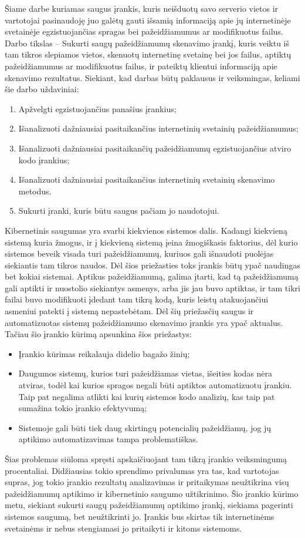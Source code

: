 Šiame darbe kuriamas saugus įrankis, kuris neišduotų savo serverio vietos ir vartotojai pasinaudoję juo galėtų gauti išsamią informaciją apie jų internetinėje svetainėje egzistuojančias spragas
bei pažeidžiamumus ar modifikuotus failus. Darbo tikslas – Sukurti saugų pažeidžiamumų skenavimo įrankį, kuris veiktu iš tam tikros slepiamos vietos, skenuotų internetinę
svetainę bei jos failus, aptiktų pažeidžiamumus ar modifikuotus failus, ir pateiktų klientui informaciją apie skenavimo rezultatus. Siekiant, kad darbas būtų paklausus ir veiksmingas, keliami šie
darbo uždaviniai:
\begin{enumerate}
	\item Apžvelgti egzistuojančius panašius įrankius;
	\item Išanalizuoti dažniausiai pasitaikančius internetinių svetainių pažeidžiamumus;
	\item Išanalizuoti dažniausiai pasitaikančių pažeidžiamumų egzistuojančius atviro kodo įrankius;
	\item Išanalizuoti dažniausiai pasitaikančius internetinių svetainių skenavimo metodus.
	\item Sukurti įranki, kuris būtu saugus pačiam jo naudotojui.
\end{enumerate}
Kibernetinis saugumas yra svarbi kiekvienos sistemos dalis. Kadangi kiekvieną sistemą kuria
žmogus, ir į kiekvieną sistemą įeina žmogiškasis faktorius, dėl kurio sistemos beveik visada turi
pažeidžiamumų, kuriuos gali išnaudoti puolėjas siekiantis tam tikros naudos. Dėl šios priežasties
toks įrankis būtų ypač naudingas bet kokiai sistemai. Aptikus pažeidžiamumą, galima įtarti, kad
tą pažeidžiamumą gali aptikti ir nuostolio siekiantys asmenys, arba jis jau buvo aptiktas, ir tam tikri
failai buvo modifikuoti įdedant tam tikrą kodą, kuris leistų atakuojančiui asmeniui patekti į sistemą
nepastebėtam.
Dėl šių priežasčių saugus ir automatizuotas sistemų pažeidžiamumo skenavimo įrankis yra
ypač aktualus. Tačiau šio įrankio kūrimą apsunkina šios priežastys:
\begin{itemize}
	\item Įrankio kūrimas reikalauja didelio bagažo žinių;
	\item Daugumos sistemų, kurios turi pažeidžiamas vietas, išeities kodas nėra atviras, todėl kai kurios spragos negali būti aptiktos automatizuotu įrankiu. Taip pat negalima atlikti kai kurių sistemos kodo analizių, kas taip pat sumažina tokio įrankio efektyvumą;
	\item Sistemoje gali būti tiek daug skirtingų potencialių pažeidžiamų, jog jų aptikimo automatizavimas tampa problematiškas.
\end{itemize}
Šias problemas siūloma spręsti apskaičiuojant tam tikrą įrankio veiksmingumą procentaliai.
Didžiausias tokio sprendimo privalumas yra tas, kad vartotojas supras, jog tokio įrankio rezultatų
analizavimas ir pritaikymas neužtikrina visų pažeidžiamumų aptikimo ir kibernetinio saugumo
užtikrinimo.
Šio įrankio kūrimo metu, siekiant sukurti saugų pažeidžiamumų aptikimo įrankį, siekiama pagerinti sistemos saugumą, bet neužtikrinti jo. Įrankis bus skirtas tik internetinėms svetainėms ir
nebus stengiamasi jo pritaikyti ir kitoms sistemoms.